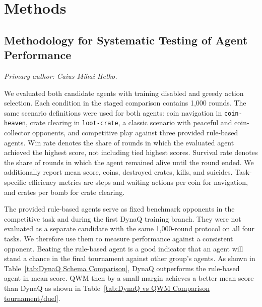 \documentclass[article, 10pt]{IEEEtran}
\begin{document}
\section{Methods}\label{sec:4_methods}

\subsection{Methodology for Systematic Testing of Agent Performance}\label{sec:evaluation_methodology}

\textit{Primary author: Caius Mihai Hetko.}

We evaluated both candidate agents with training disabled and greedy action selection. Each condition in the staged comparison contains 1,000 rounds. The same scenario definitions were used for both agents: coin navigation in \texttt{coin-heaven}, crate clearing in \texttt{loot-crate}, a classic scenario with peaceful and coin-collector opponents, and competitive play against three provided rule-based agents. Win rate denotes the share of rounds in which the evaluated agent achieved the highest score, not including tied highest scores. Survival rate denotes the share of rounds in which the agent remained alive until the round ended. We additionally report mean score, coins, destroyed crates, kills, and suicides. Task-specific efficiency metrics are steps and waiting actions per coin for navigation, and crates per bomb for crate clearing.

The provided rule-based agents serve as fixed benchmark opponents in the competitive task and during the first DynaQ training branch. They were not evaluated as a separate candidate with the same 1,000-round protocol on all four tasks. We therefore use them to measure performance against a consistent opponent. Beating the rule-based agent is a good indicator that an agent will stand a chance in the final tournament against other group's agents. As shown in Table~\ref{tab:DynaQ Schema Comparison}, DynaQ outperforms the rule-based agent in mean score. QWM then by a small margin achieves a better mean score than DynaQ as shown in Table~\ref{tab:DynaQ vs QWM Comparison tournament/duel}.
\end{document}
